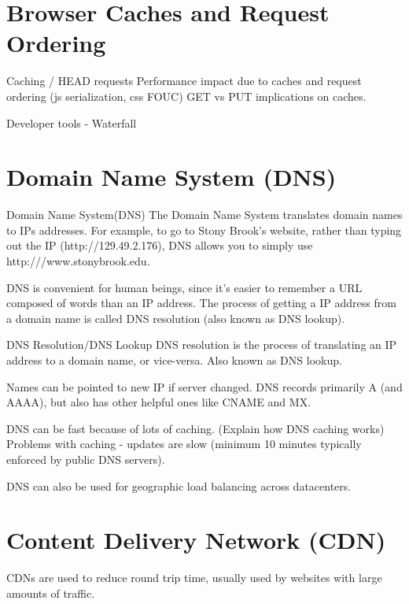 \documentclass[fancy,11pt,titlestyle=display]{style/elegantbook}
\begin{document}
\section{Browser Caches and Request Ordering}

Caching / HEAD requests 
Performance impact due to caches and request ordering (js serialization, css FOUC)
GET vs PUT implications on caches.

Developer tools - Waterfall

\section{Domain Name System (DNS)}

\begin{definition}{Domain Name System(DNS)}{}
The Domain Name System translates domain names to IPs addresses. For example, to go to Stony Brook's website, rather than typing out the IP (http://129.49.2.176), DNS allows you to simply use http:///www.stonybrook.edu.
\end{definition}

DNS is convenient for human beings, since it's easier to remember a URL composed of words than an IP address. The process of getting a IP address from a domain name is called DNS resolution (also known as DNS lookup).

\begin{definition}{DNS Resolution/DNS Lookup}{}
DNS resolution is the process of translating an IP address to a domain name, or vice-versa. Also known as DNS lookup.

\end{definition}

Names can be pointed to new IP if server changed.
DNS records primarily A (and AAAA), but also has other helpful ones like CNAME and MX.

DNS can be fast because of lots of caching.  (Explain how DNS caching works)  Problems with caching - updates are slow (minimum 10 minutes typically enforced by public DNS servers).

DNS can also be used for geographic load balancing across datacenters.

\section{Content Delivery Network (CDN)}
CDNs are used to reduce round trip time, usually used by websites with large amounts of traffic.
\end{document}
